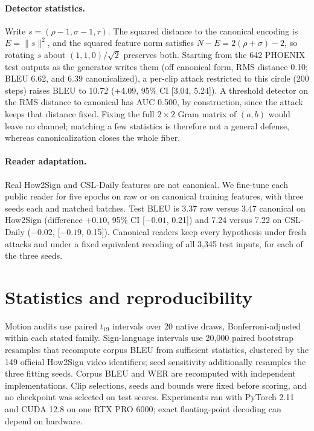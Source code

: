 \documentclass[10pt,twocolumn,letterpaper]{article}
\begin{document}
\paragraph{Detector statistics.} Write $s=(\rho-1,\sigma-1,\tau)$. The squared distance to the canonical encoding is $E=\|s\|^2$, and the squared feature norm satisfies $N-E=2(\rho+\sigma)-2$, so rotating $s$ about $(1,1,0)/\sqrt2$ preserves both. Starting from the 642 PHOENIX test outputs as the generator writes them (off canonical form, RMS distance 0.10; BLEU 6.62, and 6.39 canonicalized), a per-clip attack restricted to this circle (200 steps) raises BLEU to 10.72 (+4.09, 95\% CI [3.04, 5.24]). A threshold detector on the RMS distance to canonical has AUC 0.500, by construction, since the attack keeps that distance fixed. Fixing the full $2\times2$ Gram matrix of $(a,b)$ would leave no channel; matching a few statistics is therefore not a general defense, whereas canonicalization closes the whole fiber.

\paragraph{Reader adaptation.} Real How2Sign and CSL-Daily features are not canonical. We fine-tune each public reader for five epochs on raw or on canonical training features, with three seeds each and matched batches. Test BLEU is 3.37 raw versus 3.47 canonical on How2Sign (difference $+0.10$, 95\% CI [$-0.01$, 0.21]) and 7.24 versus 7.22 on CSL-Daily ($-0.02$, [$-0.19$, 0.15]). Canonical readers keep every hypothesis under fresh attacks and under a fixed equivalent recoding of all 3,345 test inputs, for each of the three seeds.

\section{Statistics and reproducibility}\label{sec:stats}
Motion audits use paired $t_{19}$ intervals over 20 native draws, Bonferroni-adjusted within each stated family. Sign-language intervals use 20,000 paired bootstrap resamples that recompute corpus BLEU from sufficient statistics, clustered by the 149 official How2Sign video identifiers; seed sensitivity additionally resamples the three fitting seeds. Corpus BLEU and WER are recomputed with independent implementations. Clip selections, seeds and bounds were fixed before scoring, and no checkpoint was selected on test scores. Experiments ran with PyTorch 2.11 and CUDA 12.8 on one RTX PRO 6000; exact floating-point decoding can depend on hardware.

{\small}
\end{document}
